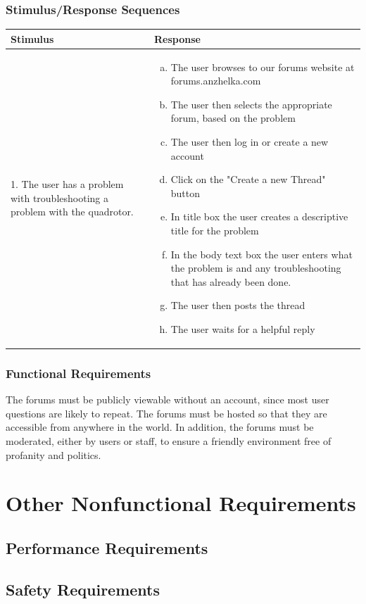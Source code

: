 \documentclass[english]{article}
\numberwithin{equation}{section} %
\begin{document}
\subsubsection{Stimulus/Response Sequences}

\begin{longtable}{p{3cm} | p{8.5cm}}
\hline
\textbf{Stimulus} & \textbf{Response}\\
\hline
1. The user has a problem with troubleshooting a problem with the quadrotor. &
\begin{enumerate}[(a)]\itemsep1pt %
\item The user browses to our forums website at forums.anzhelka.com
\item The user then selects the appropriate forum, based on the problem
\item The user then log in or create a new account
\item Click on the "Create a new Thread" button
\item In title box the user creates a descriptive title for the problem
\item In the body text box the user enters what the problem is and any troubleshooting that has already been done.
\item The user then posts the thread
\item The user waits for a helpful reply
\end{enumerate}
\\ 
\hline
\end{longtable}
\subsubsection{Functional Requirements}
The forums must be publicly viewable without an account, since most user questions are likely to repeat. The forums must be hosted so that they are accessible from anywhere in the world. In addition, the forums must be moderated, either by users or staff, to ensure a friendly environment free of profanity and politics.


\newpage
\section{Other Nonfunctional Requirements}
\subsection{Performance Requirements}
\subsection{Safety Requirements}
\end{document}
